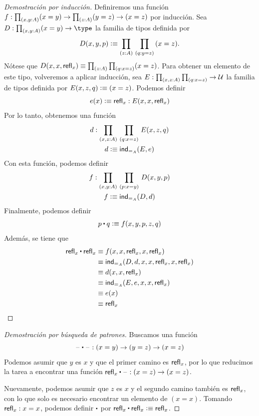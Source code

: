 \documentclass[../main.tex]{subfiles}
\begin{document}
\begin{proof}[Demostración por inducción]
  Definiremos una funci\'on $f : \prd{x,y:A} (x= y) \to \prd{z:A} (y= z)\to (x=  z)$ por inducci\'on. Sea $D:\prd{x,y:A} (x=y) \to \type$ la familia de tipos definida por
  \begin{equation*}
    D(x,y,p)\defeq \prd{z:A}{q:y=z} (x=z).
  \end{equation*}
  N\'otese que $D(x,x,\refl x) \jdeq \prd{z:A}{q:x=z} (x=z)$.
  Para obtener un elemento de este tipo, volveremos a aplicar inducción, sea $E:\prd{x,z:A}{q:x=z}\to \UU$ la familia de tipos definida por $E(x,z,q)\vcentcolon\equiv (x=z)$.
  Podemos definir
  \begin{equation*}
    e(x) \vcentcolon\equiv \mathsf{refl}_{x} : E(x,x,\mathsf{refl}_{x})
  \end{equation*}
  Por lo tanto, obtenemos una funci\'on
  \begin{gather*}
    d : \prd{x,z:A}{q:x=z} E(x,z,q) \\
    d \defeq \ind{=_A}(E, e)
  \end{gather*}
  Con esta funci\'on, podemos definir
  \begin{gather*}
    f : \prd{x,y:A}{p:x=y} D(x,y,p) \\
    f \defeq \ind{=_A}(D, d)
  \end{gather*}
  Finalmente, podemos definir
  \[ p \ct q \defeq f(x,y,p,z,q) \]
  Adem\'as, se tiene que
  \begin{align*}
    \refl{x} \ct \refl{x} & \jdeq f(x,x,\refl{x},x,\refl{x} )            \\
                          & \jdeq \ind{=_A}(D,d,x,x,\refl{x},x,\refl{x}) \\
                          & \jdeq d(x,x,\refl{x})                        \\
                          & \jdeq \ind{=_A}(E,e,x,x,\refl{x})            \\
                          & \jdeq e(x)                                   \\
                          & \jdeq \refl{x}
  \end{align*}
\end{proof}

\begin{proof}[Demostración por b\'usqueda de patrones]
  Buscamos una función
  \[{\blank} \ct {\blank} : (x= y) \to   (y= z)\to (x=  z)\]
  Podemos asumir que $y$ es $x$ y que el primer camino es $\mathsf{refl}_{x}$, por lo que reducimos la tarea a encontrar una función ${\refl{x}} \ct {\blank} : (x= z) \to (x=  z)$.

  Nuevamente, podemos asumir que $z$ es $x$ y el segundo camino tambi\'en es $\mathsf{refl}_{x}$, con lo que solo es necesario encontrar un elemento de $(x=x)$. Tomando $\mathsf{refl}_{x}:x=x$, podemos definir $\ct$ por $\refl{x} \ct \refl{x}\defeq \refl{x}$.
\end{proof}
\end{document}

